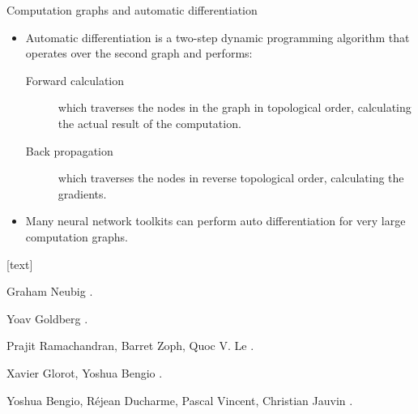 \begin{frame}{Computation graphs and automatic differentiation}
\begin{itemize}[<+->]
\item Automatic differentiation is a two-step dynamic programming algorithm that operates
over the second graph and performs:
\begin{description}
\item[Forward calculation] which traverses the nodes in the graph in topological order,
calculating the actual result of the computation.
\item[Back propagation] which traverses the nodes in reverse topological order, calculating
the gradients.
\end{description}
\item Many neural network toolkits can perform auto differentiation for very large computation graphs.
\end{itemize}
\end{frame}

\begin{frame}
[text]
\begin{thebibliography}{10}

\alert{Graham Neubig}
.

\alert{Yoav Goldberg}
.

\alert{Prajit Ramachandran, Barret Zoph, Quoc V. Le}
.

\alert{Xavier Glorot, Yoshua Bengio}
.

\alert{Yoshua Bengio, R\'ejean Ducharme, Pascal Vincent, Christian Jauvin}
.

\end{thebibliography}
\end{frame}




 
 
